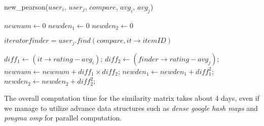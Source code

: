 \begin{algorithm}
	\label{algo:newpearson}
	\caption{new\_pearson($user_i$, $user_j$, $compare$, $avg_i$, $avg_j$)}
	\begin{algorithmic} 
		\STATE $newnum \leftarrow 0$
		\STATE $newden_1 \leftarrow 0$
		\STATE $newden_2 \leftarrow 0$
		
		\STATE $iterator finder = user_j.find(compare, it \rightarrow itemID)$
	
		\STATE $diff_1 \leftarrow (it \rightarrow rating - avg_i)$;
		\STATE $diff_2 \leftarrow (finder \rightarrow rating - avg_j)$;
		\STATE $newnum \leftarrow newnum +  diff_1\times diff_2$;
		\STATE $newden_1 \leftarrow newden_1 + diff_1^2$;
		\STATE $newden_2 \leftarrow newden_2 + diff_2^2$;
		\ENDIF
		
		\ENDFOR
        \RETURN
	\end{algorithmic}
\end{algorithm}

The overall computation time for the similarity matrix takes about $4$ days, even if we manage to utilize advance data structures such as \textit{dense google hash maps} and \textit{pragma omp} for parallel computation.
